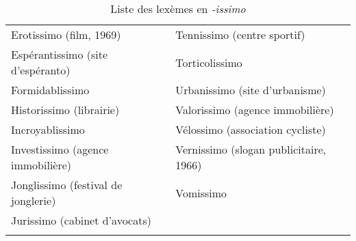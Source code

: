 \documentclass[output=paper]{langsci/langscibook}
\begin{document}
\begin{table}
\begin{tabularx}{\textwidth}{QQ}
Erotissimo (film, 1969)	&	Tennissimo (centre sportif)	\\
Espérantissimo (site d'espéranto)	&	Torticolissimo	\\
Formidablissimo	&	Urbanissimo (site d'urbanisme)	\\
Historissimo (librairie)	&	Valorissimo (agence immobilière)	\\
Incroyablissimo	&	Vélossimo (association cycliste)	\\
Investissimo (agence immobilière)	&	Vernissimo (slogan publicitaire, 1966)	\\
Jonglissimo (festival de jonglerie)	&	Vomissimo	\\
Jurissimo (cabinet d'avocats)	&		\\
\lspbottomrule
\end{tabularx}
\caption{Liste des lexèmes en \emph{-issimo}\label{tab:annexe}}
\end{table}
{\sloppy
\printbibliography[heading=subbibliography,notkeyword=this]
}
\end{document}
